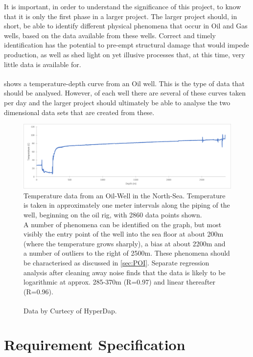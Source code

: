 \documentclass[main.tex]{subfiles}
\begin{document}
    
  It is important, in order to understand the significance of this project, to know that it is only the first phase in a larger project. The larger project should, in short, be able to identify different physical phenomena that occur in Oil and Gas wells, based on the data available from these wells. Correct and timely identification has the potential to pre-empt structural damage that would impede production, as well as shed light on yet illusive processes that, at this time, very little data is available for.
  \\\\
   shows a temperature-depth curve from an Oil well. This is the type of data that should be analysed. However, of each well there are several of these curves taken per day and the larger project should ultimately be able to analyse the two dimensional data sets that are created from these. 
  
  \begin{figure}[h]
    \centering
    \includegraphics[width=\linewidth]{figures/wellData}
    \caption{Temperature data from an Oil-Well in the North-Sea. Temperature is taken in approximately one meter intervals along the piping of the well, beginning on the oil rig, with 2860 data points shown. \\
    A number of phenomena can be identified on the graph, but most visibly the entry point of the well into the sea floor at about 200m (where the temperature grows sharply), a bias at about 2200m and a number of outliers to the right of 2500m. These phenomena should be characterised as discussed in \cref{sec:POI}. Separate regression analysis after cleaning away noise finds that the data is likely to be logarithmic at approx. 285-370m (R=0.97) and linear thereafter (R=0.96).
    \\\\
    Data by Curtecy of HyperDap.}
    \label{fig:well}
  \end{figure}
  
  \section{Requirement Specification}
  
\end{document}
